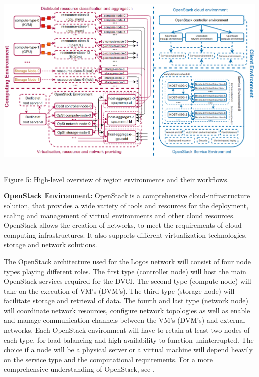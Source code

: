\documentclass[]{article}
\begin{document}
\begin{center}
	\includegraphics[height=9cm]{region-environments}
\end{center}
\begin{center}
	Figure 5: High-level overview of region environments and their workflows.
\end{center}

\textbf{OpenStack Environment:}
OpenStack is a comprehensive cloud-infrastructure solution, that provides a wide variety of tools and resources for the deployment, scaling and management of virtual environments and other cloud resources. 
OpenStack allows the creation of networks, to meet the requirements of cloud-computing infrastructures. 
It also supports different virtualization technologies, storage and network solutions.

The OpenStack architecture used for the Logos network will consist of four node types playing different roles.
The first type (controller node) will host the main OpenStack services required for the DVCI.
The second type (compute node) will take on the execution of VM's (DVM's).
The third type (storage node) will facilitate storage and retrieval of data.
The fourth and last type (network node) will coordinate network resources, configure network topologies as well as enable and manage communication channels between the VM's (DVM's) and external networks. 
Each OpenStack environment will have to retain at least two nodes of each type, for load-balancing and high-availability to function uninterrupted.
The choice if a node will be a physical server or a virtual machine will depend heavily on the service type and the computational requirements.
For a more comprehensive understanding of OpenStack, see \cite{OpenStackDoc-design}.
\end{document}

